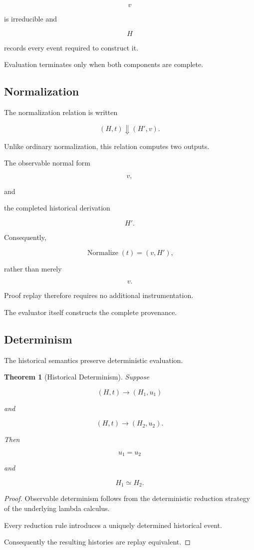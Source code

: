 \documentclass[12pt,oneside]{article}
\newtheorem{theorem}{Theorem}[section]
\theoremstyle{definition}
\theoremstyle{remark}
\DeclareMathOperator{\Normalize}{Normalize}
\begin{document}
\[
v
\]

is irreducible and

\[
H
\]

records every event required to construct it.

Evaluation terminates only when both components are complete.

\subsection{Normalization}

The normalization relation is written

\[
(H,t)
\Downarrow
(H',v).
\]

Unlike ordinary normalization, this relation computes two outputs.

The observable normal form

\[
v,
\]

and

the completed historical derivation

\[
H'.
\]

Consequently,

\[
\Normalize(t)
=
(v,H'),
\]

rather than merely

\[
v.
\]

Proof replay therefore requires no additional instrumentation.

The evaluator itself constructs the complete provenance.

\subsection{Determinism}

The historical semantics preserve deterministic evaluation.

\begin{theorem}[Historical Determinism]

Suppose

\[
(H,t)
\longrightarrow
(H_1,u_1)
\]

and

\[
(H,t)
\longrightarrow
(H_2,u_2).
\]

Then

\[
u_1
=
u_2
\]

and

\[
H_1
\simeq
H_2.
\]

\end{theorem}

\begin{proof}

Observable determinism follows from the deterministic reduction strategy of the
underlying lambda calculus.

Every reduction rule introduces a uniquely determined historical event.

Consequently the resulting histories are replay equivalent.

\end{proof}
\end{document}
